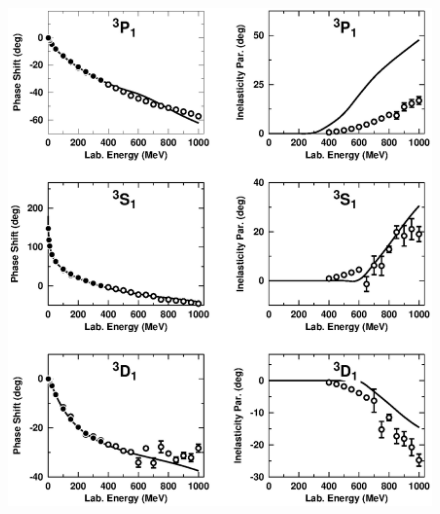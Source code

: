 \begin{flushleft}
\begin{figure}%
\begin{flushleft}
\includegraphics[height=20cm,width=18cm]{figd85_alt2.ps}
\end{flushleft}
\end{figure}
\end{flushleft}

